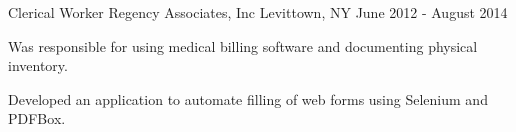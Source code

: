 

\begin{cventries}

  \cventry
    {Clerical Worker} %
    {Regency Associates, Inc} %
    {Levittown, NY} %
    {June 2012 - August 2014} %
    {
      \begin{cvitems} %
        \item {Was responsible for using medical billing software and documenting physical inventory.}
        \item {Developed an application to automate filling of web forms using Selenium and PDFBox.}
      \end{cvitems}
    }
\end{cventries}
